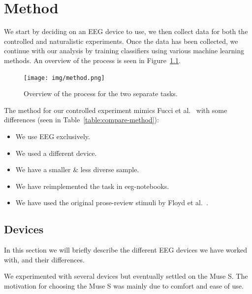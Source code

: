\chapter{Method}

We start by deciding on an EEG device to use, we then collect data for both the controlled and naturalistic experiments. Once the data has been collected, we continue with our analysis by training classifiers using various machine learning methods. An overview of the process is seen in Figure~\ref{fig:method}.

\begin{figure}[h]
    \centering
    \texttt{[image: img/method.png]}
    \caption{Overview of the process for the two separate tasks.}\label{fig:method}
\end{figure}

\begin{minipage}{\textwidth}
The method for our controlled experiment mimics Fucci et al.~\cite{fucci_replication_2019} with some differences (seen in Table~\ref{table:compare-method}): 

\begin{itemize}
        \item We use EEG exclusively.
        \item We used a different device.
        \item We have a smaller \& less diverse sample.
        \item We have reimplemented the task in eeg-notebooks.
        \item We have used the original prose-review stimuli by Floyd et al.~\cite{floyd_decoding_2017}.
\end{itemize}
\end{minipage}

\begin{landscape}
    
\end{landscape}

\section{Devices}
    
    In this section we will briefly describe the different EEG devices we have worked with, and their differences.

    We experimented with several devices but eventually settled on the Muse S. The motivation for choosing the Muse S was mainly due to comfort and ease of use. 

